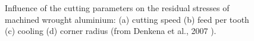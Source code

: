 \begin{figure}[ht]
	\centering
	\noindent{}
	\decoRule
	\caption[Influence of the cutting parameters on the residual stresses of machined wrought aluminium: (a) cutting speed (b) feed per tooth (c) cooling (d) corner radius.]{Influence of the cutting parameters on the residual stresses of machined wrought aluminium: (a) cutting speed (b) feed per tooth (c) cooling (d) corner radius (from Denkena et al., 2007 \parencite{Denkena2007}).}
	\label{fig:Mach}
\end{figure}




